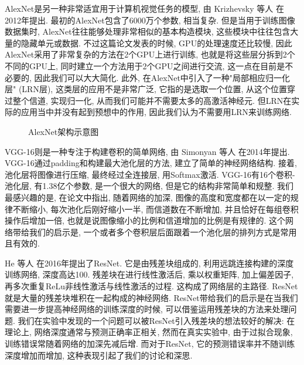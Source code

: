 \documentclass[lang=cn, 11pt,   a4paper]{elegantpaper}
\begin{document}
AlexNet是另一种非常适宜用于计算机视觉任务的模型, 由 Krizhevsky 等人 \cite{krizhevsky12} 在2012年提出. 最初的AlexNet包含了6000万个参数, 相当复杂. 但是当用于训练图像数据集时, AlexNet往往能够处理非常相似的基本构造模块, 这些模块中往往包含大量的隐藏单元或数据. 不过这篇论文发表的时候, GPU的处理速度还比较慢, 因此AlexNet采用了非常复杂的方法在2个GPU上进行训练, 也就是将这些层分拆到2个不同的GPU上, 同时建立一个方法用于2个GPU之间进行交流, 这一点在目前是不必要的, 因此我们可以大大简化. 此外, 在AlexNet中引入了一种"局部相应归一化层" (LRN层), 这类层的应用不是非常广泛, 它指的是选取一个位置, 从这个位置穿过整个信道, 实现归一化, 从而我们可能并不需要太多的高激活神经元. 但LRN在实际的应用当中并没有起到预想中的作用, 因此我们认为不需要用LRN来训练网络. 
\begin{figure}[H]
\label{fig: lenet}
\caption{AlexNet架构示意图}
\end{figure}

VGG-16则是一种专注于构建卷积的简单网络, 由 Simonyan 等人 \cite{simonyan14} 在2014年提出. VGG-16通过padding和构建最大池化层的方法, 建立了简单的神经网络结构. 接着, 池化层将图像进行压缩, 最终经过全连接层, 用Softmax激活. VGG-16有16个卷积-池化层, 有1.38亿个参数, 是一个很大的网络, 但是它的结构非常简单和规整. 我们最感兴趣的是, 在论文中指出, 随着网络的加深, 图像的高度和宽度都在以一定的规律不断缩小, 每次池化后刚好缩小一半, 而信道数在不断增加, 并且恰好在每组卷积操作后增加一倍, 也就是说图像缩小的比例和信道增加的比例是有规律的. 这个网络带给我们的启示是, 一个或者多个卷积层后面跟着一个池化层的排列方式是常用且有效的. 

He 等人 \cite{he16} 在2016年提出了ResNet. 它是由残差块组成的, 利用远跳连接构建的深度训练网络, 深度高达100. 残差块在进行线性激活后, 乘以权重矩阵, 加上偏差因子, 再多次重复ReLu非线性激活与线性激活的过程. 这构成了网络层的主路径.  ResNet就是大量的残差块堆积在一起构成的神经网络. ResNet带给我们的启示是在当我们需要进一步提高神经网络的训练深度的时候, 可以借鉴运用残差块的方法来处理问题. 我们在实验中发现的一个问题可以被ResNet引入残差块的想法较好的解决:  在理论上, 网络深度通常与预测正确率正相关, 然而在真实实验中, 由于过拟合现象, 训练错误常随着网络的加深先减后增. 而对于ResNet, 它的预测错误率并不随训练深度增加而增加, 这种表现引起了我们的讨论和深思. 
\end{document}
